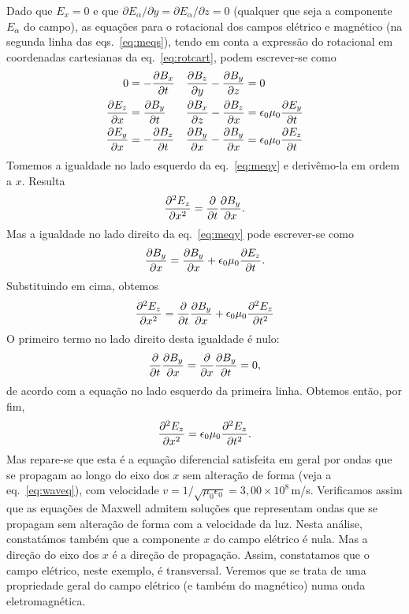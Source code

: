 Dado que $E_x=0$ e que $\partial E_\alpha/\partial y=\partial E_\alpha/\partial
z=0$ (qualquer que seja a componente $E_\alpha$ do campo), as equações para o
rotacional dos campos elétrico e magnético (na segunda linha das
eqs.~\eqref{eq:meqs}), tendo em conta a expressão do rotacional em coordenadas
cartesianas da eq.~\eqref{eq:rotcart}, podem escrever-se como
\begin{subequations}
\begin{align}
  0&=-\frac{\partial B_x}{\partial t}&        \frac{\partial B_z}{\partial y}-\frac{\partial B_y}{\partial z}&=0\label{eq:meqx}\\
  \frac{\partial E_z}{\partial x}&=\frac{\partial B_y}{\partial t}&  \frac{\partial B_x}{\partial z}-\frac{\partial B_z}{\partial x}&=
    \epsilon_0\mu_0\frac{\partial E_y}{\partial t} \label{eq:meqy}\\
  \frac{\partial E_y}{\partial x}&=-\frac{\partial B_z}{\partial t}& 
    \frac{\partial B_y}{\partial x}-\frac{\partial B_y}{\partial x}&=\epsilon_0\mu_0\frac{\partial E_z}{\partial t}\label{eq:meqz}
\end{align}
\end{subequations}
Tomemos a igualdade no lado esquerdo da eq.~\eqref{eq:meqy} e derivêmo-la em
ordem a $x$. Resulta
\begin{equation*}
  \frac{\partial^2 E_z}{\partial x^2}=\frac{\partial }{\partial t}\frac{\partial B_y}{\partial x}.
\end{equation*}
Mas a igualdade no lado direito da eq.~\eqref{eq:meqy} pode escrever-se como
\begin{equation*}
  \frac{\partial B_y}{\partial x}=\frac{\partial B_y}{\partial x}+\epsilon_0\mu_0\frac{\partial E_z}{\partial t}.
\end{equation*}
Substituindo em cima, obtemos
\begin{equation*}
  \frac{\partial^2 E_z}{\partial x^2}=\frac{\partial }{\partial t}\frac{\partial B_y}{\partial x}+\epsilon_0\mu_0\frac{\partial^2 E_z}{\partial t^2}
\end{equation*}
O primeiro termo no lado direito desta igualdade é nulo:
\begin{equation*}
  \frac{\partial }{\partial t}\frac{\partial B_y}{\partial x}=\frac{\partial }{\partial x}\frac{\partial B_y}{\partial t}=0,
\end{equation*}
de acordo com a equação no lado esquerdo da primeira linha. Obtemos então, por
fim,
\begin{equation*}
  \frac{\partial^2 E_z}{\partial x^2}=\epsilon_0\mu_0\frac{\partial^2 E_z}{\partial t^2}.
\end{equation*}
Mas repare-se que esta é a equação diferencial satisfeita em geral por ondas que
se propagam ao longo do eixo dos $x$ sem alteração de forma (veja a
eq.~\eqref{eq:waveq}), com velocidade
$v=1/\sqrt{\mu_0\epsilon_0}=3,00\times10^{8}$\,m/s.  Verificamos assim que as
equações de Maxwell admitem soluções que representam ondas que se propagam sem
alteração de forma com a velocidade da luz. Nesta análise, constatámos também que a
componente $x$ do campo elétrico é nula. Mas a direção do eixo dos $x$ é a
direção de propagação.  Assim, constatamos que o campo elétrico, neste exemplo,
é transversal. Veremos que se trata de uma propriedade geral do campo elétrico
(e também do magnético) numa onda eletromagnética.


